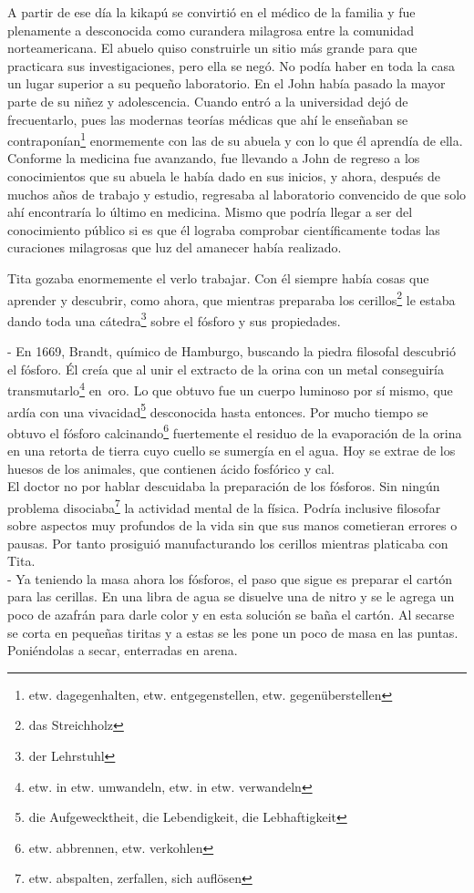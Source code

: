 A partir de ese día \glqq{}la kikapú\grqq{} se convirtió en el médico de la familia
y fue plenamente a desconocida como curandera milagrosa entre la
comunidad norteamericana. El abuelo quiso construirle un sitio más
grande para que practicara sus investigaciones, pero ella se negó. No
podía haber en toda la casa un lugar superior a su pequeño laboratorio.
En el John había pasado la mayor parte de su niñez y adolescencia.
Cuando entró a la universidad dejó de frecuentarlo, pues las modernas
teorías médicas que ahí le enseñaban se contraponían\footnote{etw. dagegenhalten, etw. entgegenstellen, etw. gegenüberstellen}
enormemente con las de su abuela y con lo que él aprendía de ella.
Conforme la medicina fue avanzando, fue llevando a John de regreso a
los conocimientos que su abuela le había dado en sus inicios, y ahora,
después de muchos años de trabajo y estudio, regresaba al laboratorio
convencido de que solo ahí encontraría lo último en medicina. Mismo
que podría llegar a ser del conocimiento público si es que él lograba
comprobar científicamente todas las curaciones milagrosas que
\glqq{}luz del amanecer\grqq{} había realizado.

Tita gozaba enormemente el verlo trabajar. Con él siempre había cosas
que aprender y descubrir, como ahora, que mientras preparaba los cerillos\footnote{das Streichholz}
le estaba dando toda una cátedra\footnote{der Lehrstuhl} sobre
el fósforo y sus propiedades.

- En 1669, Brandt, químico de Hamburgo, buscando la piedra filosofal %
descubrió el fósforo. Él creía que al unir el extracto de la orina con %
un metal conseguiría transmutarlo\footnote{etw. in etw. umwandeln, etw. in etw. verwandeln} %
en~oro. Lo que obtuvo fue un cuerpo luminoso por sí mismo, que %
ardía con una vivacidad\footnote{die Aufgewecktheit, die Lebendigkeit, die Lebhaftigkeit} %
desconocida hasta entonces. Por mucho tiempo se obtuvo el fósforo calcinando\footnote{etw. abbrennen, etw. verkohlen} %
fuertemente el residuo %
de la evaporación de la orina en una retorta de tierra cuyo cuello se %
sumergía en el agua. Hoy se extrae de los huesos de los animales, que %
contienen ácido fosfórico y cal.\\

El doctor no por hablar descuidaba la preparación de los fósforos. Sin
ningún problema disociaba\footnote{etw. abspalten, zerfallen, sich auflösen}
la actividad mental de la física. Podría inclusive filosofar sobre aspectos
muy profundos de la vida sin que sus manos cometieran errores o pausas.
Por tanto prosiguió manufacturando los cerillos mientras platicaba con Tita.
\\- Ya teniendo la masa ahora los fósforos, el paso que sigue es preparar %
el cartón para las cerillas. En una libra de agua se disuelve una de %
nitro y se le agrega un poco de azafrán para darle color y en esta %
solución se baña el cartón. Al secarse se corta en pequeñas tiritas y a %
estas se les pone un poco de masa en las puntas. Poniéndolas a secar, %
enterradas en arena.\\

